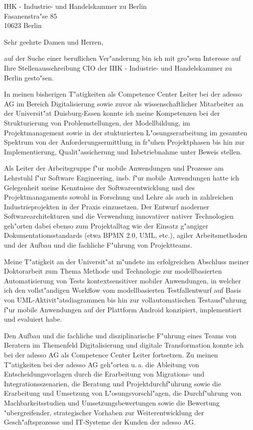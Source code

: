 \documentclass[11pt,a4paper]{dinbrief}
\date{\today}
\begin{document}
 
\begin{letter}  
{%
	IHK - Industrie- und Handelskammer zu Berlin\\
	Fasanenstra"se 85\\
	10623 Berlin
}
\subject{\bf Bewerbung CIO}
\opening{Sehr geehrte Damen und Herren,}
auf der Suche einer beruflichen Ver"anderung bin ich mit gro"sem Interesse auf Ihre Stellenausschreibung CIO der IHK - Industrie- und Handelskammer zu Berlin gesto"sen. 

In meinen bisherigen T"atigkeiten als Competence Center Leiter bei der adesso AG im Bereich Digitalisierung sowie zuvor als wissenschaftlicher Mitarbeiter an der Universit"at Duisburg-Essen konnte ich meine Kompetenzen bei der Strukturierung von Problemstellungen, der Modellbildung, im Projektmanagement sowie in der stukturierten L"osungserarbeitung im gesamten Spektrum von der Anforderungsermittlung in fr"uhen Projektphasen bis hin zur Implementierung, Qualit"assicherung und Inbetriebnahme unter Beweis stellen.

Als Leiter der Arbeitsgruppe f"ur mobile Anwendungen und Prozesse am Lehrstuhl f"ur Software Engineering, insb. f"ur mobile Anwendungen hatte ich Gelegenheit meine Kenntnisse der Softwareentwicklung und des Projektmanagaments sowohl in Forschung und Lehre als auch in zahlreichen Industrieprojekten in der Praxis einzusetzen. Der Entwurf moderner Softwarearchitekturen und die Verwendung innovativer nativer Technologien  geh"orten dabei ebenso zum Projektalltag wie der Einsatz g"angiger Dokumentationsstandards (etwa BPMN 2.0, UML, etc.), agiler Arbeitsmethoden und der Aufbau und die fachliche F"uhrung von Projektteams.

Meine T"atigkeit an der Universit"at m"undete im erfolgreichen Abschluss meiner Doktor\-arbeit zum Thema Methode und Technologie zur modellbasierten Automatisierung von Tests kontextsensitiver mobiler Anwendungen, in welcher ich den vollst"andigen Workflow vom modellbasierten Testfallentwurf auf Basis von UML-Aktivit"atsdiagrammen bis hin zur vollautomatischen Testausf"uhrung f"ur mobile Anwendungen auf der Plattform Android konzipiert, implementiert und evaluiert habe.

\clearpage
Den Aufbau und die fachliche und disziplinarische F"uhrung eines Teams von Beratern im Themenfeld Digitalisierung und digitale Transformation  konnte ich bei der adesso AG als Competence Center Leiter fortsetzen. Zu meinen T"atigkeiten bei der adesso AG geh"orten u.\,a. die Ableitung von Entscheidungsvorlagen durch die Erarbeitung von Migrations- und Integrationsszenarien, die Beratung und Projektdurchf"uhrung sowie die Erarbeitung und Umsetzung von L"osungsvorschl"agen, die Durchf"uhrung von Machbarkeitsstudien und Umsetzungsbewertungen sowie die Bewertung "ubergreifender, strategischer Vorhaben zur Weiterentwicklung der Gesch"aftsprozesse und IT-Systeme der Kunden der adesso AG.


\end{letter}
\end{document}
